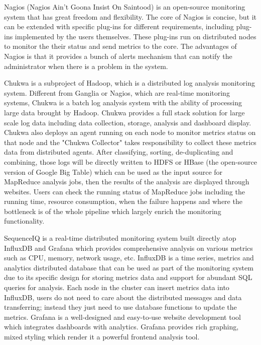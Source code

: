 Nagios (Nagios Ain’t Goona Insist On Saintood) \cite{josephsen2007building} is an open-source monitoring system that has great freedom and flexibility. 
The core of Nagios is concise, but it can be extended with specific plug-ins for different requirements, including plug-ins implemented by the users themselves.
These plug-ins run on distributed nodes to monitor the their status and send metrics to the core. 
The advantages of Nagios is that it provides a bunch of alerts mechanism that can notify the administrator when there is a problem in the system.
\par
Chukwa\cite{boulon2008chukwa} is a subproject of Hadoop, which is a distributed log analysis monitoring system. 
Different from Ganglia or Nagios, which are real-time monitoring systems, Chukwa is a batch log analysis system with the ability of processing large data brought by Hadoop.
Chukwa provides a full stack solution for large scale log data including data collection, storage, analysis and dashboard display.
Chukwa also deploys an agent running on each node to monitor metrics status on that node and the "Chukwa Collector" takes responsibility to collect these metrics data from distributed agents. 
After classifying, sorting, de-duplicating and combining, those logs will be directly written to HDFS or HBase (the open-source version of Google Big Table\cite{chang2008bigtable}) which can be used as the input source for MapReduce analysis jobs, then the results of the analysis are displayed through websites.
Users can check the running status of MapReduce jobs including the running time, resource consumption, when the failure happens and where the bottleneck is of the whole pipeline which largely enrich the monitoring functionality.
\par
SequenceIQ\cite{http://sequenceiq.com} is a real-time distributed monitoring system built directly atop InfluxDB and Grafana which provides comprehensive analysis on various metrics such as CPU, memory, network usage, etc.
InfluxDB\cite{http://influxdb.com} is a time series, metrics and analytics distributed database that can be used as part of the monitoring system due to its specific design for storing metrics data and support for abundant SQL queries for analysis.
Each node in the cluster can insert metrics data into InfluxDB, users do not need to care about the distributed messages and data transferring; instead they just need to use database functions to update the metrics.
Grafana\cite{http://grafana.org} is a well-designed and easy-to-use website development tool which integrates dashboards with analytics. Grafana provides rich graphing, mixed styling which render it a powerful frontend analysis tool.
\par

